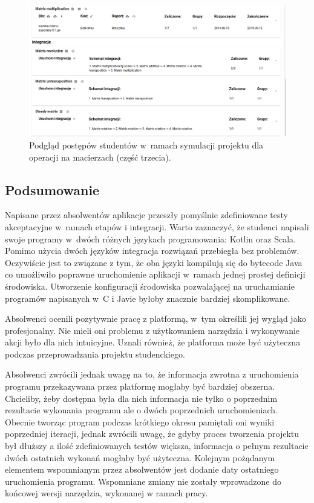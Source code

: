 \begin{figure}[H]
    \centering
    \includegraphics[width = 16cm]{chapter07/matrix_preview_part_3.png}
    \caption{Podgląd postępów studentów w~ramach symulacji projektu dla operacji na macierzach (część trzecia).}
    \label{fig:matrix_preview_part_3}
\end{figure}


\subsection{Podsumowanie}

Napisane przez absolwentów aplikacje przeszły pomyślnie zdefiniowane testy akceptacyjne w~ramach etapów i integracji.
Warto zaznaczyć, że studenci napisali swoje programy w~dwóch różnych językach programowania: Kotlin oraz Scala.
Pomimo użycia dwóch języków integracja rozwiązań przebiegła bez problemów.
Oczywiście jest to związane z tym, że oba języki kompilują się do bytecode Java co umożliwiło poprawne uruchomienie aplikacji w~ramach jednej prostej definicji środowiska.
Utworzenie konfiguracji środowiska pozwalającej na uruchamianie programów napisanych w~C i Javie byłoby znacznie bardziej skomplikowane.

Absolwenci ocenili pozytywnie pracę z platformą, w~tym określili jej wygląd jako profesjonalny.
Nie mieli oni problemu z użytkowaniem narzędzia i wykonywanie akcji było dla nich intuicyjne.
Uznali również, że platforma może być użyteczna podczas przeprowadzania projektu studenckiego.

Absolwenci zwrócili jednak uwagę na to, że informacja zwrotna z uruchomienia programu przekazywana przez platformę mogłaby być bardziej obszerna.
Chcieliby, żeby dostępna była dla nich informacja nie tylko o poprzednim rezultacie wykonania programu ale o dwóch poprzednich uruchomieniach.
Obecnie tworząc program podczas krótkiego okresu pamiętali oni wyniki poprzedniej iteracji, jednak zwrócili uwagę, że gdyby proces tworzenia projektu był dłuższy a ilość zdefiniowanych testów większa, informacja o pełnym rezultacie dwóch ostatnich wykonań mogłaby być użyteczna.
Kolejnym pożądanym elementem wspomnianym przez absolwentów jest dodanie daty ostatniego uruchomienia programu.
Wspomniane zmiany nie zostały wprowadzone do końcowej wersji narzędzia, wykonanej w ramach pracy.

